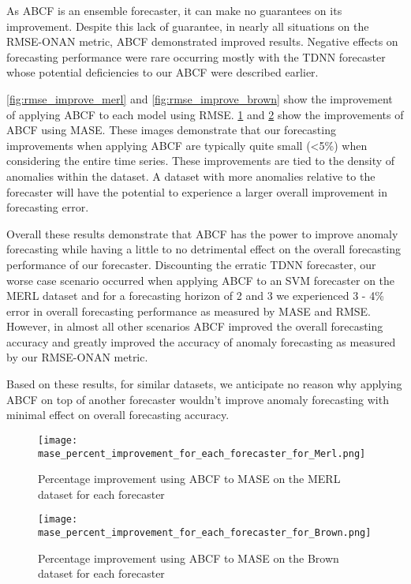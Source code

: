 As ABCF is an ensemble forecaster, it can make no guarantees on its improvement.  Despite this lack of guarantee, in nearly all situations on the RMSE-ONAN metric, ABCF demonstrated improved results.  Negative effects on forecasting performance were rare occurring mostly with the TDNN forecaster whose potential deficiencies to our ABCF were described earlier.

\ref{fig:rmse_improve_merl} and \ref{fig:rmse_improve_brown} show the improvement of applying ABCF to each model using RMSE. \ref{fig:mase_improve_merl} and \ref{fig:mase_improve_brown} show the improvements of ABCF using MASE.  These images demonstrate that our forecasting improvements when applying ABCF are typically quite small (<5\%) when considering the entire time series.  These improvements are tied to the density of anomalies within the dataset.  A dataset with more anomalies relative to the forecaster will have the potential to experience a larger overall improvement in forecasting error.

Overall these results demonstrate that ABCF has the power to improve anomaly forecasting while having a little to no detrimental effect on the overall forecasting performance of our forecaster.  Discounting the erratic TDNN forecaster, our worse case scenario occurred when applying ABCF to an SVM forecaster on the MERL dataset and for a forecasting horizon of 2 and 3 we experienced 3 - 4\% error in overall forecasting performance as measured by MASE and RMSE.  However, in almost all other scenarios ABCF improved the overall forecasting accuracy and greatly improved the accuracy of anomaly forecasting as measured by our RMSE-ONAN metric.

Based on these results, for similar datasets, we anticipate no reason why applying ABCF on top of another forecaster wouldn't improve anomaly forecasting with minimal effect on overall forecasting accuracy.  



\begin{figure}[p]
	\begin{center}
		\texttt{[image: mase\_percent\_improvement\_for\_each\_forecaster\_for\_Merl.png]}
	\end{center}
	\caption{Percentage improvement using ABCF to MASE on the MERL dataset for each forecaster}
	\label{fig:mase_improve_merl}
\end{figure}

\begin{figure}[p]
	\begin{center}
		\texttt{[image: mase\_percent\_improvement\_for\_each\_forecaster\_for\_Brown.png]}
	\end{center}
	\caption{Percentage improvement using ABCF to MASE on the Brown dataset for each forecaster}
	\label{fig:mase_improve_brown}
\end{figure}

